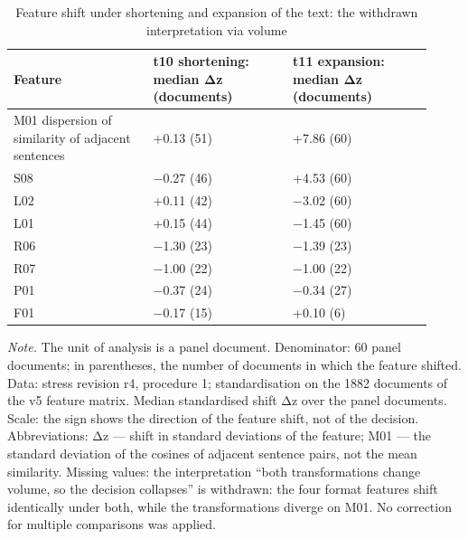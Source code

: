\begin{table}[htbp]
\centering
\small
\caption{Feature shift under shortening and expansion of the text: the withdrawn interpretation via volume}
\label{tab:s15}
\begin{tabular}{>{\raggedright\arraybackslash}p{0.307\linewidth}>{\raggedright\arraybackslash}p{0.307\linewidth}>{\raggedright\arraybackslash}p{0.307\linewidth}}
\toprule
Feature & t10 shortening: median Δz (documents) & t11 expansion: median Δz (documents) \\
\midrule
M01 dispersion of similarity of adjacent sentences & +0.13 (51) & +7.86 (60) \\
S08 & −0.27 (46) & +4.53 (60) \\
L02 & +0.11 (42) & −3.02 (60) \\
L01 & +0.15 (44) & −1.45 (60) \\
R06 & −1.30 (23) & −1.39 (23) \\
R07 & −1.00 (22) & −1.00 (22) \\
P01 & −0.37 (24) & −0.34 (27) \\
F01 & −0.17 (15) & +0.10 (6) \\
\bottomrule
\end{tabular}
\begin{minipage}{\linewidth}\footnotesize\vspace{2pt}
\textit{Note.} The unit of analysis is a panel document. Denominator: 60 panel documents; in parentheses, the number of documents in which the feature shifted. Data: stress revision r4, procedure 1; standardisation on the 1882 documents of the v5 feature matrix. Median standardised shift Δz over the panel documents. Scale: the sign shows the direction of the feature shift, not of the decision. Abbreviations: Δz — shift in standard deviations of the feature; M01 — the standard deviation of the cosines of adjacent sentence pairs, not the mean similarity. Missing values: the interpretation ``both transformations change volume, so the decision collapses'' is withdrawn: the four format features shift identically under both, while the transformations diverge on M01. No correction for multiple comparisons was applied.
\end{minipage}
\end{table}
